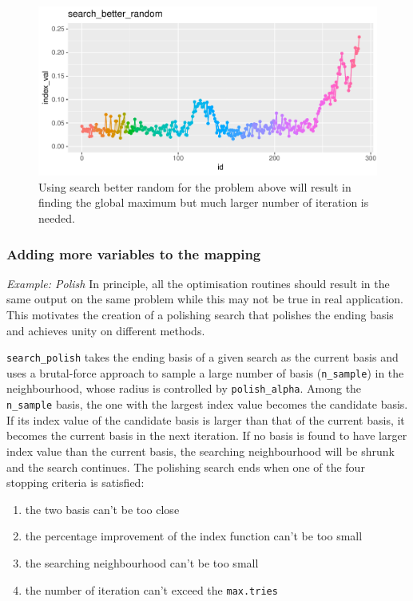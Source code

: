 \documentclass[12pt]{article}
\providecommand{\tightlist}{%
  \setlength{\itemsep}{0pt}\setlength{\parskip}{0pt}}
\begin{document}
\begin{figure}
\centering
\includegraphics{paper_files/figure-latex/1d-2var-better-random-1.pdf}
\caption{\label{1d-2var-better-random}Using search better random for the
problem above will result in finding the global maximum but much larger
number of iteration is needed.}
\end{figure}

\hypertarget{adding-more-variables-to-the-mapping}{%
\subsubsection{Adding more variables to the
mapping}\label{adding-more-variables-to-the-mapping}}

\emph{Example: Polish} In principle, all the optimisation routines
should result in the same output on the same problem while this may not
be true in real application. This motivates the creation of a polishing
search that polishes the ending basis and achieves unity on different
methods.

\texttt{search\_polish} takes the ending basis of a given search as the
current basis and uses a brutal-force approach to sample a large number
of basis (\texttt{n\_sample}) in the neighbourhood, whose radius is
controlled by \texttt{polish\_alpha}. Among the \texttt{n\_sample}
basis, the one with the largest index value becomes the candidate basis.
If its index value of the candidate basis is larger than that of the
current basis, it becomes the current basis in the next iteration. If no
basis is found to have larger index value than the current basis, the
searching neighbourhood will be shrunk and the search continues. The
polishing search ends when one of the four stopping criteria is
satisfied:

\begin{enumerate}
\def\labelenumi{\arabic{enumi})}
\tightlist
\item
  the two basis can't be too close
\item
  the percentage improvement of the index function can't be too small
\item
  the searching neighbourhood can't be too small
\item
  the number of iteration can't exceed the \texttt{max.tries}
\end{enumerate}
\end{document}
